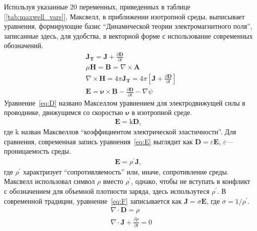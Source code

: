 \documentclass[12pt, oneside, a4paper]{article}
\begin{document}
Используя указанные 20 переменных, приведенных в таблице [\ref{tab:maxwell_vars}], Максвелл, в приближении изотропной среды, выписывает уравнения, формирующие базис ``Динамической теории электромагнитного поля'', записанные здесь, для удобства, в векторной форме с использование современных обозначений.
\begin{align}
&\mathbf{J_T}=\mathbf{J}+\frac{\partial{\mathbf{D}}}{\partial{t}}\label{eq:A}\\
&\mu\mathbf{H} = \mathbf{B} = \nabla\times\mathbf{A}\label{eq:B}\\
&\nabla\times\mathbf{H}=4\pi\mathbf{J_T}=4\pi\left[\mathbf{J}+\frac{\partial{\mathbf{D}}}{\partial{t}}\right]\label{eq:C}\\
&\mathbf{E}=\boldsymbol\nu\times\mathbf{B} - \frac{\partial{\mathbf{D}}}{\partial{t}} - \nabla\psi\label{eq:D}
\end{align}
Уравнение~\eqref{eq:D} названо Макселлом уравнением для электродвижущей силы в проводнике, движущимся со скоростью $\boldsymbol\nu$ в изотропной среде.
\begin{align}
\mathbf{E}=\mathrm{k}\mathbf{D},\label{eq:E}
\end{align}
где $\mathrm{k}$ назван Максвеллов ``коэффициентом электрической эластичности''. Для сравнения, современная запись уравнения~\eqref{eq:E} выглядит как $\mathbf{D}=\varepsilon\mathbf{E}$, $\varepsilon$---проницаемость среды.
\begin{align}
\mathbf{E}=\rho^{'}\mathbf{J},\label{eq:F}
\end{align}
где $\rho^{'}$ характризует ``сопротивляемость'' или, иначе, сопротивление среды. Максвелл использовал символ $\rho$ вместо $\rho^{'}$, однако, чтобы не вступать в конфликт с обозначением для объемной плотности заряда, здесь использутеся $\rho^{'}$. В современной традиции, уравнение~\eqref{eq:F} записывается как $\mathbf{J}=\sigma\mathbf{E}$, где $\sigma=1/\rho^{'}$.
\begin{align}
&\nabla\cdot\mathbf{D}=\rho\label{eq:G}\\
&\nabla\cdot\mathbf{J}+\frac{\partial{\rho}}{\partial{t}}=0\label{eq:H}
\end{align}
\end{document}
